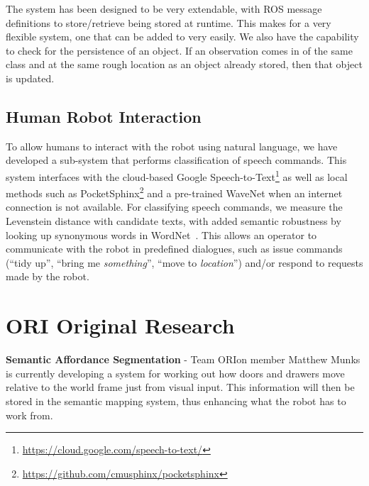 \documentclass[runningheads,a4paper]{llncs}
\newcommand{\teamori}{Team ORIon}
\begin{document}

The system has been designed to be very extendable, with ROS message definitions to store/retrieve being stored at runtime. This makes for a very flexible system, one that can be added to very easily. We also have the capability to check for the persistence of an object. If an observation comes in of the same class and at the same rough location as an object already stored, then that object is updated. 

\subsection{Human Robot Interaction}

To allow humans to interact with the robot using natural language, we have developed a sub-system that performs classification of speech commands. 
This system interfaces with the cloud-based Google Speech-to-Text\footnote{\url{https://cloud.google.com/speech-to-text/}} as well as local methods such as PocketSphinx\footnote{\url{https://github.com/cmusphinx/pocketsphinx}} and a pre-trained WaveNet \cite{oord2016wavenet} when an internet connection is not available. 
For classifying speech commands, we measure the Levenstein distance with candidate texts, with added semantic robustness by looking up synonymous words in WordNet~\cite{miller1995wordnet}. 
This allows an operator to communicate with the robot in predefined dialogues, such as issue commands (``tidy up'', ``bring me \emph{something}'', ``move to \emph{location}'') and/or respond to requests made by the robot.


\section{ORI Original Research}

\textbf{Semantic Affordance Segmentation} - \teamori{} member Matthew Munks is currently developing a system for working out how doors and drawers move relative to the world frame just from visual input. This information will then be stored in the semantic mapping system, thus enhancing what the robot has to work from.
\end{document}
